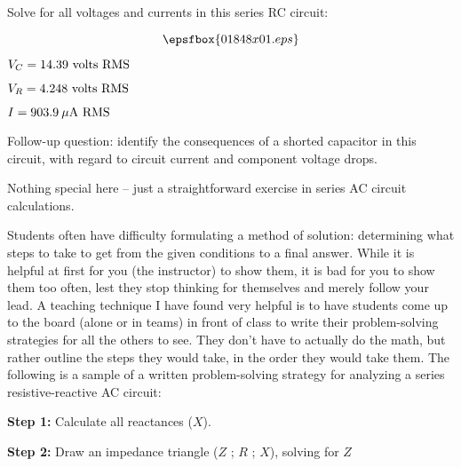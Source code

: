 

Solve for all voltages and currents in this series RC circuit:

$$\epsfbox{01848x01.eps}$$







$V_C = 14.39 \hbox{ volts RMS}$

$V_R = 4.248 \hbox{ volts RMS}$

$I = 903.9 \> \mu \hbox{A RMS}$

\vskip 10pt

Follow-up question: identify the consequences of a shorted capacitor in this circuit, with regard to circuit current and component voltage drops.







Nothing special here -- just a straightforward exercise in series AC circuit calculations.

\vskip 10pt

Students often have difficulty formulating a method of solution: determining what steps to take to get from the given conditions to a final answer.  While it is helpful at first for you (the instructor) to show them, it is bad for you to show them too often, lest they stop thinking for themselves and merely follow your lead.  A teaching technique I have found very helpful is to have students come up to the board (alone or in teams) in front of class to write their problem-solving strategies for all the others to see.  They don't have to actually do the math, but rather outline the steps they would take, in the order they would take them.  The following is a sample of a written problem-solving strategy for analyzing a series resistive-reactive AC circuit:

\vskip 10pt

\goodbreak

{\bf Step 1:} Calculate all reactances ($X$).

{\bf Step 2:} Draw an impedance triangle ($Z$ ; $R$ ; $X$), solving for $Z$

